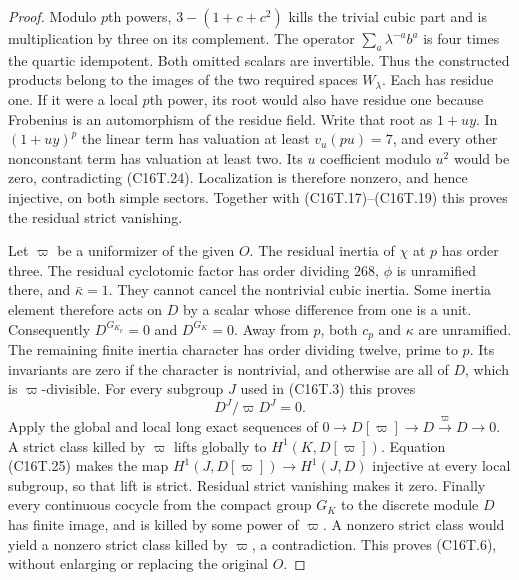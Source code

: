 \begin{proof}
Modulo $p$th powers, $3-(1+c+c^2)$ kills the trivial cubic
part and is multiplication by three on its complement.
The operator $\sum_a\lambda^{-a}b^a$ is four times the
quartic idempotent.  Both omitted scalars are invertible.
Thus the constructed products belong to the images of
the two required spaces $W_\lambda$.
Each has residue one.  If it were a local $p$th power, its
root would also have residue one because Frobenius is an
automorphism of the residue field.  Write that root as
$1+uy$.  In $(1+uy)^p$ the linear term has valuation at
least $v_u(pu)=7$, and every other nonconstant term has
valuation at least two.  Its $u$ coefficient modulo $u^2$
would be zero, contradicting (C16T.24).
Localization is therefore nonzero, and hence injective,
on both simple sectors.  Together with (C16T.17)--(C16T.19)
this proves the residual strict vanishing.

Let $\varpi$ be a uniformizer of the given $O$.
The residual inertia of $\chi$ at $p$ has order three.
The residual cyclotomic factor has order dividing $268$,
$\phi$ is unramified there, and $\bar\kappa=1$.
They cannot cancel the nontrivial cubic inertia.
Some inertia element therefore acts on $D$ by a scalar whose
difference from one is a unit.  Consequently
$D^{G_{K_p}}=0$ and $D^{G_K}=0$.
Away from $p$, both $c_p$ and $\kappa$ are unramified.
The remaining finite inertia character has order dividing twelve,
prime to $p$.  Its invariants are zero if the character is nontrivial,
and otherwise are all of $D$, which is $\varpi$-divisible.
For every subgroup $J$ used in (C16T.3) this proves
\[
                         D^J/\varpi D^J=0.
 \tag{C16T.25}
\]
Apply the global and local long exact sequences of
$0\to D[\varpi]\to D\xrightarrow{\varpi}D\to0$.
A strict class killed by $\varpi$ lifts globally to
$H^1(K,D[\varpi])$.  Equation (C16T.25) makes the map
$H^1(J,D[\varpi])\to H^1(J,D)$ injective at every local subgroup,
so that lift is strict.  Residual strict vanishing makes it zero.
Finally every continuous cocycle from the compact group $G_K$
to the discrete module $D$ has finite image, and is killed by
some power of $\varpi$.  A nonzero strict class would yield
a nonzero strict class killed by $\varpi$, a contradiction.
This proves (C16T.6), without enlarging or replacing the original $O$.
\end{proof}

